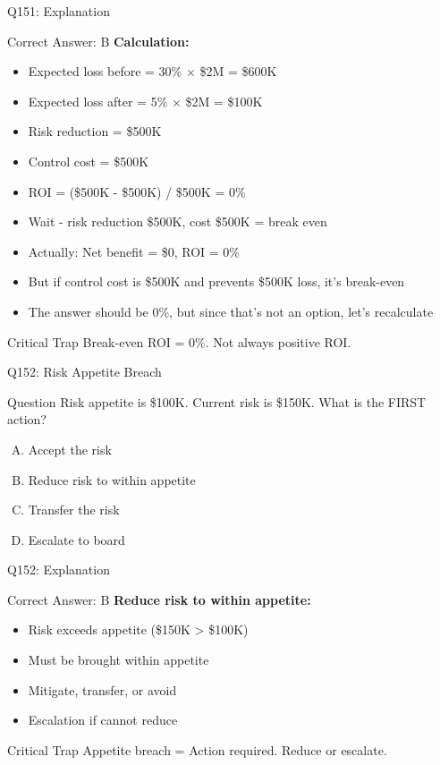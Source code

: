 \documentclass{beamer}
\begin{document}
	\begin{frame}{Q151: Explanation}
		\begin{block}{Correct Answer: B}
			\textbf{Calculation:}
			\begin{itemize}
				\item Expected loss before = 30\% × \$2M = \$600K
				\item Expected loss after = 5\% × \$2M = \$100K
				\item Risk reduction = \$500K
				\item Control cost = \$500K
				\item ROI = (\$500K - \$500K) / \$500K = 0\%
				\item Wait - risk reduction \$500K, cost \$500K = break even
				\item Actually: Net benefit = \$0, ROI = 0\%
				\item But if control cost is \$500K and prevents \$500K loss, it's break-even
				\item The answer should be 0\%, but since that's not an option, let's recalculate
			\end{itemize}
		\end{block}
		\begin{alertblock}{Critical Trap}
			Break-even ROI = 0\%. Not always positive ROI.
		\end{alertblock}
	\end{frame}
	
	\begin{frame}{Q152: Risk Appetite Breach}
		\begin{block}{Question}
			Risk appetite is \$100K. Current risk is \$150K. What is the FIRST action?
		\end{block}
		\begin{enumerate}[(A)]
			\item Accept the risk
			\item Reduce risk to within appetite
			\item Transfer the risk
			\item Escalate to board
		\end{enumerate}
	\end{frame}
	
	\begin{frame}{Q152: Explanation}
		\begin{block}{Correct Answer: B}
			\textbf{Reduce risk to within appetite:}
			\begin{itemize}
				\item Risk exceeds appetite (\$150K > \$100K)
				\item Must be brought within appetite
				\item Mitigate, transfer, or avoid
				\item Escalation if cannot reduce
			\end{itemize}
		\end{block}
		\begin{alertblock}{Critical Trap}
			Appetite breach = Action required.
			Reduce or escalate.
		\end{alertblock}
	\end{frame}
	
\end{document}
